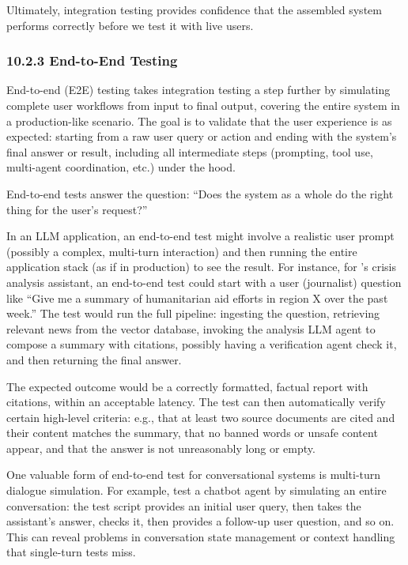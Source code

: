 Ultimately, integration testing provides confidence that the assembled system performs correctly before we test it with live users.

\subsubsection*{10.2.3 End-to-End Testing}
End-to-end (E2E) testing takes integration testing a step further by simulating complete user workflows from input to final output, covering the entire system in a production-like scenario. The goal is to validate that the user experience is as expected: starting from a raw user query or action and ending with the system’s final answer or result, including all intermediate steps (prompting, tool use, multi-agent coordination, etc.) under the hood.  

End-to-end tests answer the question: “Does the system as a whole do the right thing for the user’s request?”  

In an LLM application, an end-to-end test might involve a realistic user prompt (possibly a complex, multi-turn interaction) and then running the entire application stack (as if in production) to see the result. For instance, for \ishtar{}’s crisis analysis assistant, an end-to-end test could start with a user (journalist) question like “Give me a summary of humanitarian aid efforts in region X over the past week.” The test would run the full pipeline: ingesting the question, retrieving relevant news from the vector database, invoking the analysis LLM agent to compose a summary with citations, possibly having a verification agent check it, and then returning the final answer.  

The expected outcome would be a correctly formatted, factual report with citations, within an acceptable latency. The test can then automatically verify certain high-level criteria: e.g., that at least two source documents are cited and their content matches the summary, that no banned words or unsafe content appear, and that the answer is not unreasonably long or empty.  

One valuable form of end-to-end test for conversational systems is multi-turn dialogue simulation. For example, test a chatbot agent by simulating an entire conversation: the test script provides an initial user query, then takes the assistant’s answer, checks it, then provides a follow-up user question, and so on. This can reveal problems in conversation state management or context handling that single-turn tests miss.  

